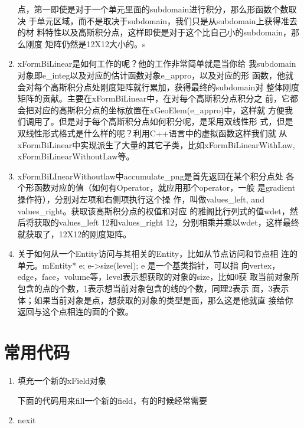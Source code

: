 \documentclass{article}
\begin{document}
\begin{enumerate}
  点，第一即使是对于一个单元里面的subdomain进行积分，那么形函数个数取决
  于单元区域，而不是取决于subdomain，我们只是从subdomain上获得准去的材
  料特性以及高斯积分点，这样即使是对于这个比自己小的subdomain，那么刚度
  矩阵仍然是12X12大小的。s
\item xFormBiLinear是如何工作的呢？他的工作非常简单就是当你给
  我subdomain对象即e\_integ以及对应的估计函数对象e\_appro，以及对应的形
  函数，他就会对每个高斯积分点处刚度矩阵就行累加，获得最终的subdomain对
  整体刚度矩阵的贡献。主要在xFormBiLinear中，在对每个高斯积分点积分之
  前，它都会把对应的高斯积分点的坐标放置在xGeoElem(e\_appro)中，这样就
  方便我们调用了。但是对于每个高斯积分点如何积分呢，是采用双线性形
  式，但是双线性形式格式是什么样的呢？利用C++语言中的虚拟函数这样我们就
  从xFormBiLinear中实现派生了大量的其它子类，比如xFormBiLinearWithLaw,
  xFormBiLinearWithoutLaw等。
\item xFormBiLInearWithoutlaw中accumulate\_png是首先返回在某个积分点处
  各个形函数对应的值（如何有Operator，就应用那个operator，一般
  是gradient操作符），分别对左项和右侧项执行这个操
  作，叫做values\_left, and values\_right。获取该高斯积分点的权值和对应
  的雅阁比行列式的值wdet，然后将获取的values\_left 12和values\_right
  12，分别相乘并乘以wdet，这样最终就获取了，12X12的刚度矩阵。
\item 关于如何从一个Entity访问与其相关的Entity，比如从节点访问和节点相
  连的单元。mEntity{*} e; e->size(level); e 是一个基类指针，可以指
  向vertex，edge，face，volume等，level表示想获取的对象的size，比如0获
  取当前对象所包含的点的个数，1表示想当前对象包含的线的个数，同理2表示
  面，3表示体；如果当前对象是点，想获取的对象的类型是面，那么这是他就直
  接给你返回与这个点相连的面的个数。
\end{enumerate}

\section{常用代码}
\label{sec:utility-codes}

\begin{enumerate}
\item 填充一个新的xField对象

下面的代码用来fill一个新的field，有的时候经常需要



\item nexit

\end{enumerate}
\end{document}
